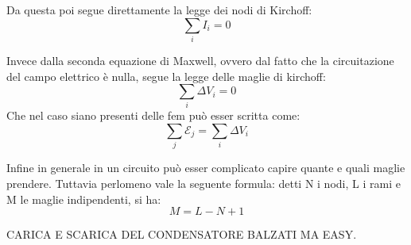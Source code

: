 Da questa poi segue direttamente la legge dei nodi di Kirchoff: 
\begin{equation} \label{eq:kirchoff_nodi} 
    \sum_i I_i = 0
\end{equation}

Invece dalla seconda equazione di Maxwell, ovvero dal fatto che la circuitazione del campo elettrico è nulla, segue la legge delle maglie di kirchoff:
\begin{equation}
    \sum_i \Delta V_i = 0
\end{equation}
Che nel caso siano presenti delle fem può esser scritta come:
\begin{equation}
    \sum_j \mathscr E_j = \sum_i \Delta V_i
\end{equation}

Infine in generale in un circuito può esser complicato capire quante e quali maglie prendere. Tuttavia perlomeno vale la seguente formula: detti N i nodi, L i rami e M le maglie indipendenti, si ha:
\begin{equation}
    M = L - N + 1
\end{equation}

CARICA E SCARICA DEL CONDENSATORE BALZATI MA EASY.

